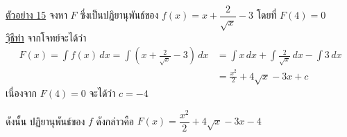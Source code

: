 \documentclass[hidelinks,12pt,a4paper]{article}
\newcommand{\s}{\space}
\newcommand{\qed}{\scalebox{0.8}{$\blacksquare$}}
\begin{document}
\underline{ตัวอย่าง 15} จงหา $F$ ซึ่งเป็นปฏิยานุพันธ์ของ $f(x)=x+\dfrac{2}{\sqrt{x}}-3$ โดยที่ $F(4)=0$ \\[1ex]
\underline{\underline{วฺิธีทำ}}\hspace{8mm} จากโจทย์จะได้ว่า 
\begin{align*}
    F(x)=\int f(x)\,dx = \int \left(x+\frac{2}{\sqrt{x}}-3\right)\,dx & = \int x\,dx+\int \frac{2}{\sqrt{x}}\,dx - \int 3\,dx \\
    & = \frac{x^2}{2} + 4\sqrt{x} -3x+c
\end{align*}
\hspace{15mm} เนื่องจาก $F(4)=0$ จะได้ว่า $c=-4$

\hspace{15mm} ดังนั้น ปฏิยานุพันธ์ของ $f$ ดังกล่าวคือ \s $F(x)=\dfrac{x^2}{2}+4\sqrt{x}-3x-4$ \hfill \qed
\end{document}
